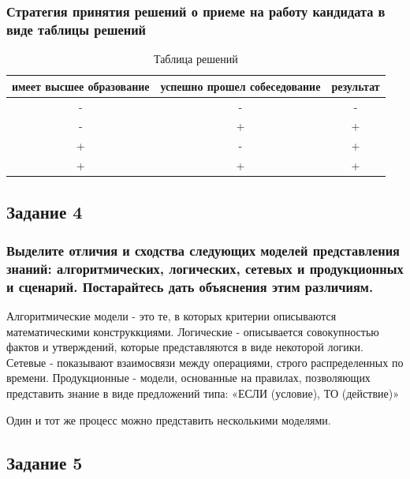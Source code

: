 \documentclass[14pt,a4paper,report]{report}
\begin{document}
\clearpage

\subsubsection{Стратегия принятия решений о приеме на работу кандидата в виде таблицы решений}

\begin{table}[h!]
\centering
\bgroup
\def\arraystretch{1}
\begin{tabular}{ | c| c | c | }
\hline
имеет высшее образование & успешно прошел собеседование & результат 
\\ \hline

- & - & - \\ \hline

- & + & + \\ \hline

+ & - & + \\ \hline

+ & + & + \\ \hline


\end{tabular}
\egroup
\caption{Таблица решений}
\label{table:1}
\end{table}

\subsection{Задание 4}

\subsubsection{Выделите отличия и сходства следующих моделей представления знаний: алгоритмических, логических, сетевых и продукционных и сценарий. Постарайтесь дать объяснения этим различиям.}

Алгоритмические модели - это те, в которых критерии описываются математическими конструккциями. Логические - описывается совокупностью фактов и утверждений, которые представляются в виде некоторой логики. Сетевые - показывают взаимосвязи между операциями, строго распределенных по времени. Продукционные - модели, основанные на правилах, позволяющих представить знание в виде предложений типа: «ЕСЛИ (условие), ТО (действие)» 

Один и тот же процесс можно представить несколькими моделями. 

\subsection{Задание 5}
\end{document}
